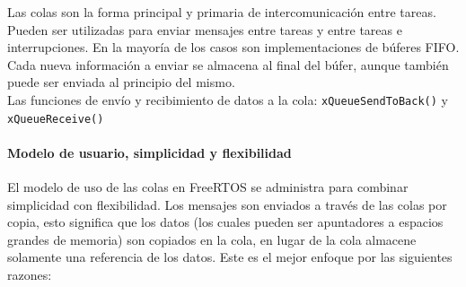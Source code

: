Las colas son la forma principal y primaria de intercomunicación entre tareas. Pueden ser utilizadas para enviar mensajes entre tareas y entre tareas e interrupciones. En la mayoría de los casos son implementaciones de búferes FIFO. Cada nueva información a enviar se almacena al final del búfer, aunque también puede ser enviada al principio del mismo.\\

Las funciones de envío y recibimiento de datos a la cola: \texttt{xQueueSendToBack()} y \texttt{xQueueReceive()}

\paragraph{Modelo de usuario, simplicidad y flexibilidad}

El modelo de uso de las colas en FreeRTOS se administra para combinar simplicidad con flexibilidad. Los mensajes son enviados a través de las colas por copia, esto significa que los datos (los cuales pueden ser apuntadores a espacios grandes de memoria) son copiados en la cola, en lugar de la cola almacene solamente una referencia de los datos. Este es el mejor enfoque por las siguientes razones:

